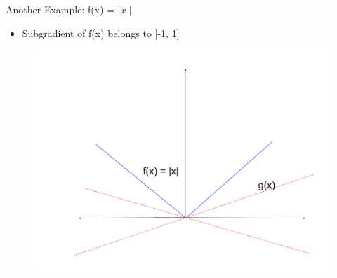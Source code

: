 \documentclass{beamer}
\begin{document}
\begin{frame}{Another Example: f(x) = $\mid x \mid$}

\begin{itemize}
\item Subgradient of f(x) belongs to [-1, 1]
\end{itemize}
\begin{figure}
    \centering
    \includegraphics[scale = 0.25]{subgradient_3.pdf}
    \label{fig:my_label}
\end{figure}
\end{frame}
\end{document}
